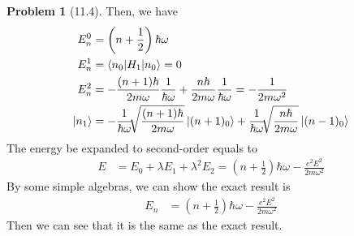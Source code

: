 \documentclass[twoside,11pt]{article}
\theoremstyle{definition}
\newtheorem{problem}{Problem}
\theoremstyle{remark}
\begin{document}
\begin{problem}[11.4]
Then, we have
\begin{align*}
    E_n^0 &= \left(n+\frac{1}{2}\right)\hbar\omega\\
    E^1_n &= \braket{n_0|H_1|n_0} = 0\\
    E^2_n &= -\frac{(n+1)\hbar}{2m\omega}\frac{1}{\hbar\omega} + \frac{n\hbar}{2m\omega}\frac{1}{\hbar\omega}
    = -\frac{1}{2m\omega^2}\\
    \ket{n_1} &= -\frac{1}{\hbar\omega}\sqrt[]{\frac{(n+1)\hbar}{2m\omega}}\ket{(n+1)_0}
    + \frac{1}{\hbar\omega}\sqrt[]{\frac{n\hbar}{2m\omega}}\ket{(n-1)_0}
\end{align*}
The energy be expanded to second-order equals to 
\begin{align*}
    E &= E_0 + \lambda E_1 + \lambda^2 E_2 
    = \left(n+\frac{1}{2}\right)\hbar\omega - \frac{e^2E^2}{2m\omega^2}
\end{align*}
By some simple algebras, we can show the exact result is
\begin{align*}
    E_n &= \left(n+\frac{1}{2}\right)\hbar\omega - \frac{e^2E^2}{2m\omega^2}
\end{align*}
Then we can see that it is the same as the exact result.
\end{problem}





\end{document}
